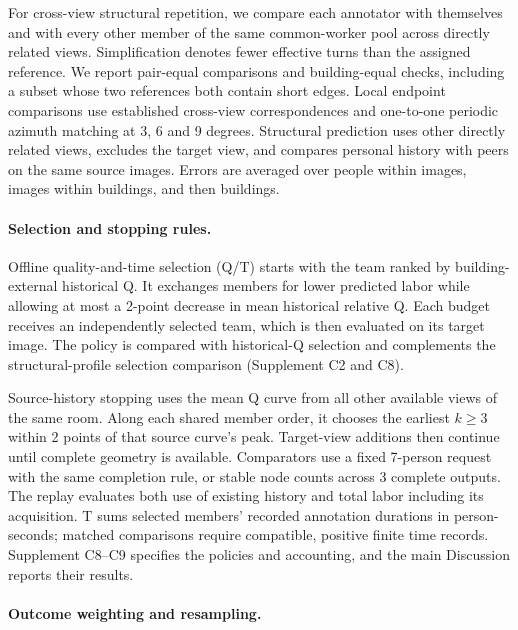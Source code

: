 For cross-view structural repetition, we compare each annotator with themselves and with every other member of the same common-worker pool across directly related views. Simplification denotes fewer effective turns than the assigned reference. We report pair-equal comparisons and building-equal checks, including a subset whose two references both contain short edges. Local endpoint comparisons use established cross-view correspondences and one-to-one periodic azimuth matching at 3, 6 and 9 degrees. Structural prediction uses other directly related views, excludes the target view, and compares personal history with peers on the same source images. Errors are averaged over people within images, images within buildings, and then buildings.



\paragraph{Selection and stopping rules.}

Offline quality-and-time selection (Q/T) starts with the team ranked by building-external historical Q. It exchanges members for lower predicted labor while allowing at most a 2-point decrease in mean historical relative Q. Each budget receives an independently selected team, which is then evaluated on its target image. The policy is compared with historical-Q selection and complements the structural-profile selection comparison (Supplement C2 and C8).

Source-history stopping uses the mean Q curve from all other available views of the same room. Along each shared member order, it chooses the earliest $k\geq3$ within 2 points of that source curve's peak. Target-view additions then continue until complete geometry is available. Comparators use a fixed 7-person request with the same completion rule, or stable node counts across 3 complete outputs. The replay evaluates both use of existing history and total labor including its acquisition. T sums selected members' recorded annotation durations in person-seconds; matched comparisons require compatible, positive finite time records. Supplement C8--C9 specifies the policies and accounting, and the main Discussion reports their results.



\paragraph{Outcome weighting and resampling.}

